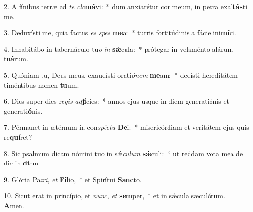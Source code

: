 2. A fínibus terræ ad \textit{te} \textit{cla}\textbf{má}vi:~*  dum anxiarétur cor meum, in petra exal\textbf{tás}ti me.\

3. Deduxísti me, quia factus \textit{es} \textit{spes} \textbf{me}a:~*  turris fortitúdinis a fácie ini\textbf{mí}ci.\

4. Inhabitábo in tabernáculo tu\textit{o} \textit{in} \textbf{sǽ}cula:~*  prótegar in velaménto alárum tu\textbf{á}rum.\

5. Quóniam tu, Deus meus, exaudísti orati\textit{ó}\textit{nem} \textbf{me}am:~*  dedísti hereditátem timéntibus nomen \textbf{tu}um.\

6. Dies super dies re\textit{gis} \textit{ad}\textbf{jí}cies:~*  annos ejus usque in diem generatiónis et generati\textbf{ó}nis.\

7. Pérmanet in ætérnum in con\textit{spéc}\textit{tu} \textbf{De}i:~*  misericórdiam et veritátem ejus quis re\textbf{quí}ret?\

8. Sic psalmum dicam nómini tuo in sǽ\textit{cu}\textit{lum} \textbf{sǽ}culi:~*  ut reddam vota mea de die in \textbf{di}em.\

9. Glória Pa\textit{tri}, \textit{et} \textbf{Fí}lio,~*  et Spirítui \textbf{Sanc}to.\

10. Sicut erat in princípio, et \textit{nunc}, \textit{et} \textbf{sem}per,~*  et in sǽcula sæculórum. \textbf{A}men.\

